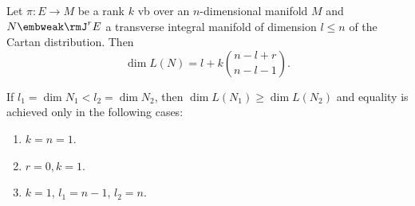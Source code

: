 \begin{prop}\label{prop 3.2.5 Kras}
    Let $\pi:E\to M$ be a rank $k$ \gls{vb} over an $n$-dimensional manifold $M$ and $N\embweak \rmJ^r E$ a transverse integral manifold of dimension $l\leq n$ of the Cartan distribution. Then 
    \[\dim L(N)=l+k\binom{n-l+r}{n-l-1}.\]
\end{prop}

\begin{cor}\label{cor 3.2.6 Kras}
    If $l_1=\dim N_1<l_2=\dim N_2$, then $\dim L(N_1)\geq \dim L(N_2)$ and equality is achieved only in the following cases:
    \begin{enumerate}[label=(\alph*)]
        \item $k=n=1$.
        \item $r=0,k=1$.
        \item $k=1$, $l_1=n-1$, $l_2=n$.
    \end{enumerate}
\end{cor}

